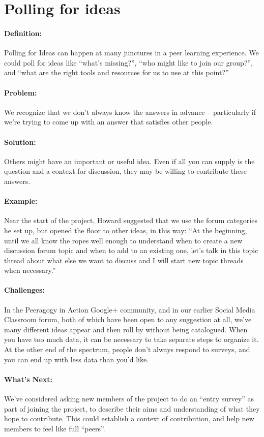 \section{Polling for ideas}
\paragraph{Definition:} Polling for Ideas can happen at many junctures in a
peer learning experience. We could poll for ideas like ``what's
missing?'', ``who might like to join our group?'', and ``what are the
right tools and resources for us to use at this point?''

\paragraph{Problem:} We recognize that we don't always know the answers in
advance -- particularly if we're trying to come up with an answer that
satisfies other people.

\paragraph{Solution:} Others might have an important or useful idea. Even
if all you can supply is the question and a context for discussion, they
may be willing to contribute these answers.

\paragraph{Example:} Near the start of the project, Howard suggested that
we use the forum categories he set up, but opened the floor to other
ideas, in this way: ``At the beginning, until we all know the ropes well
enough to understand when to create a new discussion forum topic and
when to add to an existing one, let's talk in this topic thread about
what else we want to discuss and I will start new topic threads when
necessary.''

\paragraph{Challenges:} In the Peeragogy in Action Google+ community, and
in our earlier Social Media Classroom forum, both of which have been
open to any suggestion at all, we've many different ideas appear and
then roll by without being catalogued. When you have too much data, it
can be necessary to take separate steps to organize it. At the other end
of the spectrum, people don't always respond to surveys, and you can end
up with less data than you'd like.

\paragraph{What's Next:} We've considered asking new members of the project
to do an ``entry survey'' as part of joining the project, to describe
their aims and understanding of what they hope to contribute. This could
establish a context of contribution, and help new members to feel like
full ``peers''.
